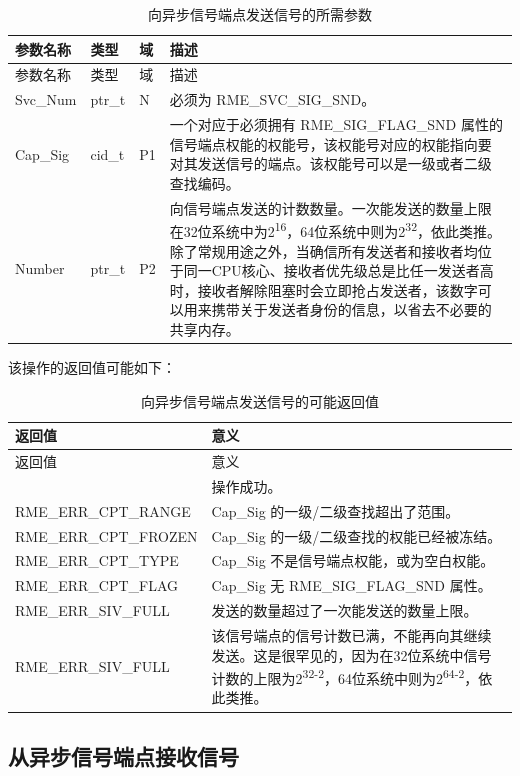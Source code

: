 \begin{xltabular}{\textwidth}{@{}>{\hsize\raggedright\arraybackslash}X>{\hsize\raggedright\arraybackslash}X>{\hsize\raggedright\arraybackslash}X>{\hsize\raggedright\arraybackslash}X@{}}
\caption{向异步信号端点发送信号的所需参数}\label{tab:5-20-send-signal-parameters}\\
\toprule
参数名称 & 类型 & 域 & 描述\tabularnewline
\endfirsthead
\toprule
参数名称 & 类型 & 域 & 描述\tabularnewline
\midrule
\endhead
\bottomrule
\endlastfoot
Svc\_Num & ptr\_t & N & 必须为 RME\_SVC\_SIG\_SND。\tabularnewline
Cap\_Sig & cid\_t & P1 &
一个对应于必须拥有 RME\_SIG\_FLAG\_SND 属性的信号端点权能的权能号，该权能号对应的权能指向要对其发送信号的端点。该权能号可以是一级或者二级查找编码。\tabularnewline
Number & ptr\_t & P2 &
向信号端点发送的计数数量。一次能发送的数量上限在32位系统中为2\textsuperscript{16}，64位系统中则为2\textsuperscript{32}，依此类推。除了常规用途之外，当确信所有发送者和接收者均位于同一CPU核心、接收者优先级总是比任一发送者高时，接收者解除阻塞时会立即抢占发送者，该数字可以用来携带关于发送者身份的信息，以省去不必要的共享内存。\tabularnewline
\end{xltabular}

该操作的返回值可能如下：

\begin{xltabular}{\textwidth}{@{}>{\hsize\raggedright\arraybackslash}X>{\hsize\raggedright\arraybackslash}X@{}}
\caption{向异步信号端点发送信号的可能返回值}\label{tab:5-21-send-signal-return-values}\\
\toprule
返回值 & 意义\tabularnewline
\endfirsthead
\toprule
返回值 & 意义\tabularnewline
\midrule
\endhead
\bottomrule
{} & 操作成功。\tabularnewline
    RME\_ERR\_CPT\_RANGE & Cap\_Sig 的一级/二级查找超出了范围。\tabularnewline
    RME\_ERR\_CPT\_FROZEN & Cap\_Sig 的一级/二级查找的权能已经被冻结。\tabularnewline
    RME\_ERR\_CPT\_TYPE & Cap\_Sig 不是信号端点权能，或为空白权能。\tabularnewline
    RME\_ERR\_CPT\_FLAG & Cap\_Sig 无 RME\_SIG\_FLAG\_SND 属性。\tabularnewline
    RME\_ERR\_SIV\_FULL & 发送的数量超过了一次能发送的数量上限。\tabularnewline
    RME\_ERR\_SIV\_FULL & 该信号端点的信号计数已满，不能再向其继续发送。这是很罕见的，因为在32位系统中信号计数的上限为2\textsuperscript{32-2}，64位系统中则为2\textsuperscript{64-2}，依此类推。\tabularnewline
\end{xltabular}

\subsection{从异步信号端点接收信号}\label{subsec:5-receive-signal-from-signal-endpoint}

